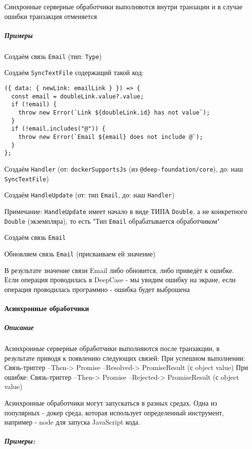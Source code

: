 \documentclass{article}
\begin{document}
Синхронные серверные обработчики выполняются внутри транзации и в случае ошибки
транзакция отменяется
\subparagraph{Примеры}

Создаём связь \texttt{Email} (тип: \texttt{Type})

Создаём \texttt{SyncTextFile} содержащий такой код:

\begin{lstlisting}
({ data: { newLink: emailLink } }) => {
  const email = doubleLink.value?.value;
  if (!email) {
    throw new Error(`Link ${doubleLink.id} has not value`);
  }
  if (!email.includes("@")) {
    throw new Error(`Email ${email} does not include @`);
  }
};
\end{lstlisting}

Создаём \texttt{Handler} (от: \texttt{dockerSupportsJs} (из
\texttt{@deep-foundation/core}), до: наш \texttt{SyncTextFile})

Создаём \texttt{HandleUpdate} (от: тип \texttt{Email}, до: наш
\texttt{Handler})

Примечание: \texttt{HandleUpdate} имеет начало в виде ТИПА \texttt{Double}, а
не конкретного \texttt{Double} (экземпляра), то есть "Тип \texttt{Email}
обрабатывается обработчиком"

Создаём связь \texttt{Email}

Обновляем связь \texttt{Email} (присваиваем ей значение)

В результате значение связи Email либо обновится, либо приведёт к ошибке.
Если операция проводилась в DeepCase - мы увидим ошибку на экране, если
операция проводилась программно - ошибка будет выброшена

\paragraph{Асинхронные обработчики}
\subparagraph{Описание}
Асинхронные серверные обработчики выполняются после транзакции, в результате
приводя к появлению следующих связей:
При успешном выполнении: Связь-триггер --Then-> Promise --Resolved->
PromiseResult (с object value)
При ошибке: Связь-триггер --Then-> Promise --Rejected-> PromiseResult (с object
value)

Асинхронные обработчики могут запускаться в разных средах. Одна из популярных -
докер среда, которая использует определенный инструмент, например - node для
запуска JavaScript кода.
\subparagraph{Примеры:}
\end{document}
